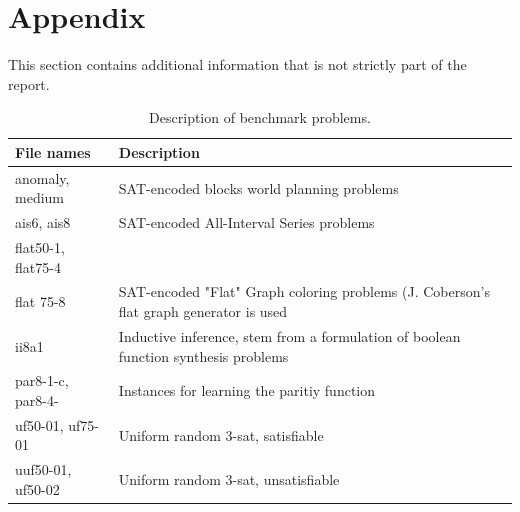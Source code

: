 \documentclass[letterpaper]{article}
\begin{document}



\newpage
\section{Appendix}
This section contains additional information that is not strictly part of the report.

\begin{table}[h]
    \centering
    \begin{tabularx}{\columnwidth}{|l|X|}
        \hline
        File names & Description\\
        \hline
        \hline
        anomaly, medium & SAT-encoded blocks world planning problems\\
        \hline
        ais6, ais8 & SAT-encoded All-Interval Series problems\\
        \hline
        flat50-1, flat75-4 \\ flat 75-8 & SAT-encoded "Flat" Graph coloring problems (J. Coberson's flat graph generator is used\\
        \hline
        ii8a1 & Inductive inference, stem from a formulation of boolean function synthesis problems\\
        \hline
        par8-1-c, par8-4- & Instances for learning the paritiy function\\
        \hline
        uf50-01, uf75-01 & Uniform random 3-sat, satisfiable\\
        \hline
        uuf50-01, uf50-02 & Uniform random 3-sat, unsatisfiable\\
        \hline
    \end{tabularx}
    \caption{Description of benchmark problems.}
    \label{tab:benchmark_set}
\end{table}
\end{document}
